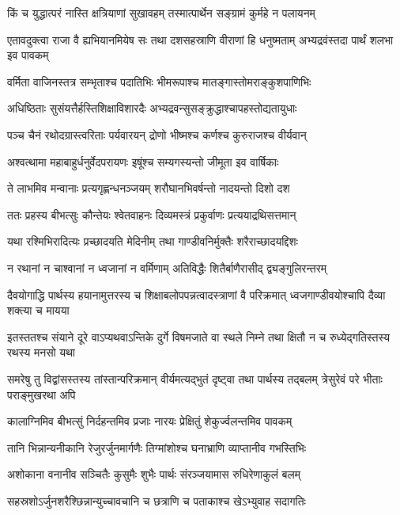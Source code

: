 \twolineshloka
{किं च युद्धात्परं नास्ति क्षत्रियाणां सुखावहम्}
{तस्मात्पार्थेन सङ्ग्रामं कुर्महे न पलायनम्}


\threelineshloka
{एतावदुक्त्वा राजा वै ह्यभियानमियेष सः}
{तथा दशसहस्राणि वीराणां हि धनुष्मताम्}
{अभ्यद्रवंस्तदा पार्थं शलभा इव पावकम्}


\twolineshloka
{वर्मिता वाजिनस्तत्र सम्भृताश्च पदातिभिः}
{भीमरूपाश्च मातङ्गास्तोमराङ्कुशपाणिभिः}



\twolineshloka
{अधिष्ठिताः सुसंयत्तैर्हस्तिशिक्षाविशारदैः}
{अभ्यद्रवन्सुसङ्क्रुद्धाश्चापहस्तोद्यतायुधाः}


\twolineshloka
{पञ्च चैनं रथोदग्रास्त्वरिताः पर्यवारयन्}
{द्रोणो भीष्मश्च कर्णश्च कुरुराजश्च वीर्यवान्}


\twolineshloka
{अश्वत्थामा महाबाहुर्धनुर्वेदपरायणः}
{इषूंश्च सम्यगस्यन्तो जीमूता इव वार्षिकाः}


\twolineshloka
{ते लाभमिव मन्वानाः प्रत्यगृह्णन्धनञ्जयम्}
{शरौघानभिवर्षन्तो नादयन्तो दिशो दश}


\twolineshloka
{ततः प्रहस्य बीभत्सुः कौन्तेयः श्वेतवाहनः}
{दिव्यमस्त्रं प्रकुर्वाणः प्रत्ययाद्रथिसत्तमान्}


\twolineshloka
{यथा रश्मिभिरादित्यः प्रच्छादयति मेदिनीम्}
{तथा गाण्डीवनिर्मुक्तैः शरैराच्छादयद्दिशः}


\twolineshloka
{न रथानां न चाश्वानां न ध्वजानां न वर्मिणाम्}
{अतिविद्धैः शितैर्बाणैरासीद् द्व्यङ्गुलिरन्तरम्}


\threelineshloka
{दैवयोगाद्धि पार्थस्य हयानामुत्तरस्य च}
{शिक्षाबलोपपन्नत्वादस्त्राणां वै परिक्रमात्}
{ध्वजगाण्डीवयोश्चापि दैव्या शक्त्या च मायया}


\threelineshloka
{इतस्ततश्च संयाने दूरे वाऽप्यथवाऽन्तिके}
{दुर्गे विषमजाते वा स्थले निम्ने तथा क्षितौ}
{न च रुध्येद्गतिस्तस्य रथस्य मनसो यथा}


\threelineshloka
{समरेषु तु विद्वांसस्तस्य तांस्तान्परिक्रमान्}
{वीर्यमत्यद्भुतं दृष्ट्वा तथा पार्थस्य तद्बलम्}
{त्रेसुरेवं परे भीताः पराङ्मुखरथा अपि}


\twolineshloka
{कालाग्निमिव बीभत्सुं निर्दहन्तमिव प्रजाः}
{नारयः प्रेक्षितुं शेकुर्ज्वलन्तमिव पावकम्}


\twolineshloka
{तानि भिन्नान्यनीकानि रेजुरर्जुनमार्गणैः}
{तिग्मांशोश्च घनाभ्राणि व्याप्तानीव गभस्तिभिः}


\twolineshloka
{अशोकाना वनानीव सञ्चितैः कुसुमैः शुभैः}
{पार्थः संरञ्जयामास रुधिरेणाकुलं बलम्}


\twolineshloka
{सहस्रशोऽर्जुनशरैश्छिन्नान्युच्चावचानि च}
{छत्राणि च पताकाश्च खेऽभ्युवाह सदागतिः}


